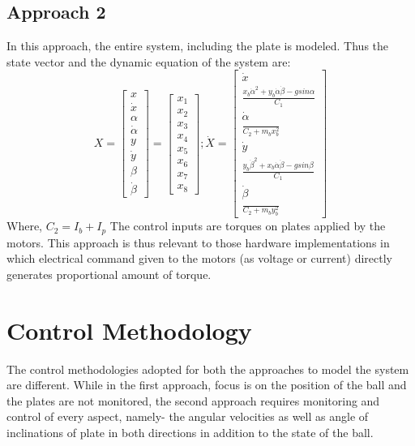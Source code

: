 \documentclass[conference]{IEEEtran}
\begin{document}
\subsection*{Approach 2 }
In this approach, the entire system, including the plate is modeled. Thus the state vector and the dynamic equation of the system are: 
\begin{equation}
X = \begin{bmatrix}
x \\ \dot x \\ \alpha \\ \dot \alpha \\ y \\ \dot y \\ \beta \\ \dot \beta
\end{bmatrix} = 
\begin{bmatrix}
x_{1} \\ x_{2} \\ x_{3} \\ x_{4} \\ x_{5} \\ x_{6} \\ x_{7} \\ x_{8}
\end{bmatrix};
\dot X = 
\begin{bmatrix}
\dot x 
\\ \frac{x_{b} \dot \alpha^{2} + y_{b} \dot \alpha \dot \beta - gsin\alpha}{C_{1}} 
\\ \dot \alpha
\\ \frac{}{C_{2} + m_{b}x_{b}^{2}}
\\ \dot y 
\\ \frac{y_{b} \dot \beta^{2} + x_{b} \dot \alpha \dot \beta - gsin\beta}{C_{1}}
\\ \dot \beta
\\ \frac{}{C_{2} + m_{b}y_{b}^{2}}
\end{bmatrix}
\end{equation}
Where, $C_{2} = I_{b} + I_{p}$
The control inputs are torques on plates applied by the motors. This approach is thus relevant to those hardware implementations in which electrical command given to the motors (as voltage or current) directly generates proportional amount of torque.



\section{Control Methodology}
The control methodologies adopted for both the approaches to model the system are different. While in the first approach, focus is on the position of the ball and the plates are not monitored, the second approach requires monitoring and control of every aspect, namely- the angular velocities as well as angle of inclinations of plate in both directions in addition to the state of the ball.
\end{document}
